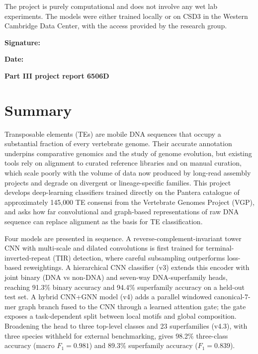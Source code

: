 \documentclass[12pt]{article}
\begin{document}
\vspace{1.5cm}

\noindent The project is purely computational and does not involve any wet lab experiments. The models were either trained locally or on CSD3 in the Western Cambridge Data Center, with the access provided by the research group. 

\vspace{2cm}

\noindent\textbf{Signature:} \hrulefill

\vspace{1cm}

\noindent\textbf{Date:} \hrulefill

\newpage
\thispagestyle{empty}

\vspace*{\fill}
\begin{center}
    {\fontsize{24.88}{34}\selectfont\bfseries Part III project report 6506D\par}
\end{center}
\vspace*{\fill}

\newpage
\section*{Summary}

Transposable elements (TEs) are mobile DNA sequences that occupy a substantial fraction of every vertebrate genome. Their accurate annotation underpins comparative genomics and the study of genome evolution, but existing tools rely on alignment to curated reference libraries and on manual curation, which scale poorly with the volume of data now produced by long-read assembly projects and degrade on divergent or lineage-specific families. This project develops deep-learning classifiers trained directly on the Pantera catalogue of approximately 145{,}000 TE consensi from the Vertebrate Genomes Project (VGP), and asks how far convolutional and graph-based representations of raw DNA sequence can replace alignment as the basis for TE classification.

Four models are presented in sequence. A reverse-complement-invariant tower CNN with multi-scale and dilated convolutions is first trained for terminal-inverted-repeat (TIR) detection, where careful subsampling outperforms loss-based reweightings. A hierarchical CNN classifier (v3) extends this encoder with joint binary (DNA vs non-DNA) and seven-way DNA-superfamily heads, reaching 91.3\% binary accuracy and 94.4\% superfamily accuracy on a held-out test set. A hybrid CNN+GNN model (v4) adds a parallel windowed canonical-7-mer graph branch fused to the CNN through a learned attention gate; the gate exposes a task-dependent split between local motifs and global composition. Broadening the head to three top-level classes and 23 superfamilies (v4.3), with three species withheld for external benchmarking, gives 98.2\% three-class accuracy (macro $F_1 = 0.981$) and 89.3\% superfamily accuracy ($F_1 = 0.839$).
\end{document}
